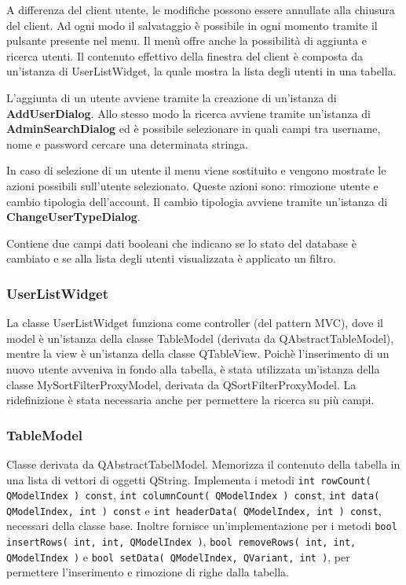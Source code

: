 \documentclass[a4paper]{article}
\begin{document}
A differenza del client utente, le modifiche possono essere annullate alla chiusura del client. Ad ogni modo il salvataggio è possibile in ogni momento tramite il pulsante presente nel menu. Il menù offre anche la possibilità di aggiunta e ricerca utenti. Il contenuto effettivo della finestra del client è composta da un'istanza di UserListWidget, la quale mostra la lista degli utenti in una tabella.

L'aggiunta di un utente avviene tramite la creazione di un'istanza di \textbf{AddUserDialog}. Allo stesso modo la ricerca avviene tramite un'istanza di \textbf{AdminSearchDialog} ed è possibile selezionare in quali campi tra username, nome e password cercare una determinata stringa.

In caso di selezione di un utente il menu viene sostituito e vengono mostrate le azioni possibili sull'utente selezionato. Queste azioni sono: rimozione utente e cambio tipologia dell'account. Il cambio tipologia avviene tramite un'istanza di \textbf{ChangeUserTypeDialog}.

Contiene due campi dati booleani che indicano se lo stato del database è cambiato e se alla lista degli utenti visualizzata è applicato un filtro.

\subsubsection*{UserListWidget}
La classe UserListWidget funziona come controller (del pattern MVC), dove il model è un'istanza della classe TableModel (derivata da QAbstractTableModel), mentre la view è un'istanza della classe QTableView. Poichè l'inserimento di un nuovo utente avveniva in fondo alla tabella, è stata utilizzata un'istanza della classe MySortFilterProxyModel, derivata da QSortFilterProxyModel. La ridefinizione è stata necessaria anche per permettere la ricerca su più campi.

\subsubsection*{TableModel}
Classe derivata da QAbstractTabelModel. Memorizza il contenuto della tabella in una lista di vettori di oggetti QString. Implementa i metodi \texttt{int rowCount( QModelIndex ) const}, \texttt{int columnCount( QModelIndex ) const}, \texttt{int data( QModelIndex, int ) const} e \texttt{int headerData( QModelIndex, int ) const}, necessari della classe base. Inoltre fornisce un'implementazione per i metodi \texttt{bool insertRows( int, int, QModelIndex )}, \texttt{bool removeRows( int, int, QModelIndex )} e \texttt{bool setData( QModelIndex, QVariant, int )}, per permettere l'inserimento e rimozione di righe dalla tabella.
\end{document}
